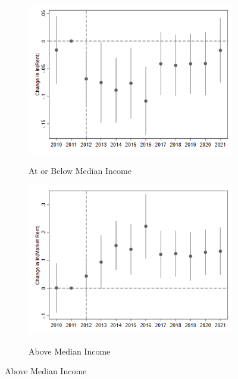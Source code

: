 \documentclass[12pt]{article}
\begin{document}
{{{{{{\begin{figure}[h!]
\begin{center}
\caption{Quality-adjusted Rent Impacts by Neighborhood Income}
\begin{subfigure}[b]{0.4\textwidth}
\caption{At or Below Median Income}
\includegraphics[scale = 0.5]{Street Easy Rents/Income Heterogeneity/R18 High Surge LowIncome_tract.png}
\label{fig:highinc}
\end{subfigure}
\hfill
\begin{subfigure}[b]{0.4\textwidth}
\caption{Above Median Income}
\includegraphics[scale = 0.5]{Street Easy Rents/Income Heterogeneity/R18 High Surge HighIncome_tract.png}
\label{fig:lowinc}
\end{subfigure}
\hfill
\end{center}
\end{figure}

}}}}}}
\end{document}
